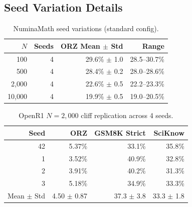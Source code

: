 \documentclass{article}
\begin{document}
\subsection{Seed Variation Details}

\begin{table}[h]
\centering
\small
\caption{NuminaMath seed variations (standard config).}
\begin{tabular}{@{}rrrr@{}}
\toprule
$N$ & Seeds & ORZ Mean $\pm$ Std & Range \\
\midrule
100 & 4 & 29.6\% $\pm$ 1.0 & 28.5--30.7\% \\
500 & 4 & 28.4\% $\pm$ 0.2 & 28.0--28.6\% \\
2,000 & 4 & 22.6\% $\pm$ 0.5 & 22.2--23.3\% \\
10,000 & 4 & 19.9\% $\pm$ 0.5 & 19.0--20.5\% \\
\bottomrule
\end{tabular}
\end{table}

\begin{table}[h]
\centering
\small
\caption{OpenR1 $N{=}2{,}000$ cliff replication across 4 seeds.}
\begin{tabular}{@{}rrrr@{}}
\toprule
Seed & ORZ & GSM8K Strict & SciKnow \\
\midrule
42 & 5.37\% & 33.1\% & 35.8\% \\
1 & 3.52\% & 40.9\% & 32.8\% \\
2 & 3.91\% & 40.2\% & 31.3\% \\
3 & 5.18\% & 34.9\% & 33.3\% \\
\midrule
Mean $\pm$ Std & 4.50 $\pm$ 0.87 & 37.3 $\pm$ 3.8 & 33.3 $\pm$ 1.8 \\
\bottomrule
\end{tabular}
\end{table}
\end{document}
